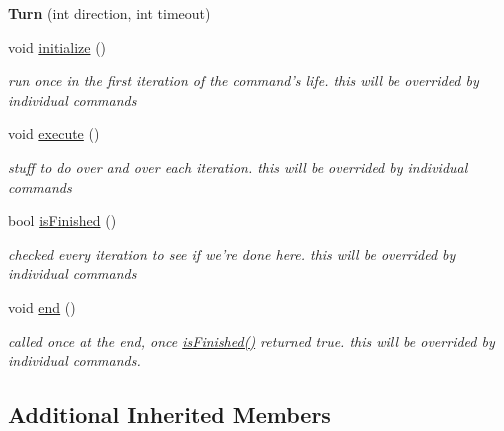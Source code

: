 \begin{DoxyCompactItemize}
\item 
\hypertarget{classTurn_a4a9fef27d1f57956ea4d50983d35294b}{{\bfseries Turn} (int direction, int timeout)}\label{classTurn_a4a9fef27d1f57956ea4d50983d35294b}

\item 
\hypertarget{classTurn_a5eb51a7d1c2776461f26019fb010c69b}{void \hyperlink{classTurn_a5eb51a7d1c2776461f26019fb010c69b}{initialize} ()}\label{classTurn_a5eb51a7d1c2776461f26019fb010c69b}

\begin{DoxyCompactList}\small\item\em run once in the first iteration of the command's life. this will be overrided by individual commands \end{DoxyCompactList}\item 
\hypertarget{classTurn_a93e23ddc414f55d3f52eb71d7d06d3d9}{void \hyperlink{classTurn_a93e23ddc414f55d3f52eb71d7d06d3d9}{execute} ()}\label{classTurn_a93e23ddc414f55d3f52eb71d7d06d3d9}

\begin{DoxyCompactList}\small\item\em stuff to do over and over each iteration. this will be overrided by individual commands \end{DoxyCompactList}\item 
bool \hyperlink{classTurn_af7420468ed671ef0d1db487361f0bf41}{is\-Finished} ()
\begin{DoxyCompactList}\small\item\em checked every iteration to see if we're done here. this will be overrided by individual commands \end{DoxyCompactList}\item 
\hypertarget{classTurn_a3fc900a7951717778569127d978ba236}{void \hyperlink{classTurn_a3fc900a7951717778569127d978ba236}{end} ()}\label{classTurn_a3fc900a7951717778569127d978ba236}

\begin{DoxyCompactList}\small\item\em called once at the end, once \hyperlink{classTurn_af7420468ed671ef0d1db487361f0bf41}{is\-Finished()} returned true. this will be overrided by individual commands. \end{DoxyCompactList}\end{DoxyCompactItemize}
\subsection*{Additional Inherited Members}


